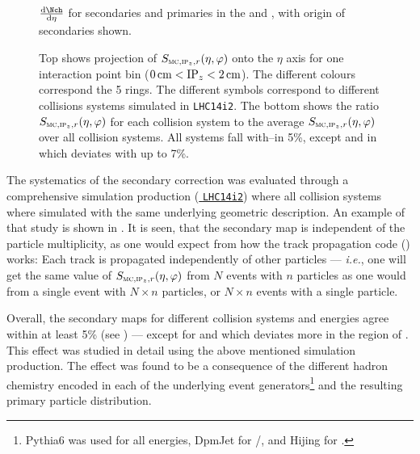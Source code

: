 \begin{figure}[htbp]
  \centering
  \caption{$\dndeta$ for secondaries and primaries in the \FMD{} and
    \SPD{}, with origin of secondaries shown.}
  \label{fig:secondaries:origin}
\end{figure} 

\begin{figure}[htbp]
  \centering
  \caption{Top shows projection of $\SecMap$ onto the $\eta$ axis for
    one interaction point bin ($\unit[0]{cm}<\IPz{}<\unit[2]{cm}$).
    The different colours correspond the 5 \FMD{} rings.  The
    different symbols correspond to different collisions systems
    simulated in \texttt{LHC14i2}.  The bottom shows the ratio
    $\SecMap$ for each collision system to the average $\SecMap$ over
    all collision systems. All systems fall with--in 5\%, except
    \PbpCol{} and \PbPbCol{} in  which deviates with up to
    7\%. }
  \label{fig:secmap:all}
\end{figure} 


 
The systematics of the secondary correction was evaluated through a
comprehensive simulation production
(\href{https://alimonitor.cern.ch/job_details.jsp?jt_field1=LHC14i2}{%
  \texttt{LHC14i2}}) where all collision systems where simulated with
the same underlying geometric description. An example of that study is
shown in .  It is seen, that the secondary map
is independent of the particle multiplicity, as one would expect from
how the track propagation code () works: Each track is
propagated independently of other particles --- \textit{i.e.}, one will
get the same value of $\SecMap$ from $N$ events with $n$ particles as
one would from a single event with $N\times n$ particles, or
$N\times n$ events with a single particle.

Overall, the secondary maps for different collision systems and
energies agree within at least 5\% (see ) ---
except for \PbPbCol{} and \PbpCol{} which deviates more in the region
of .  This effect was studied in detail using the above
mentioned simulation production.  The effect was found to be a
consequence of the different hadron chemistry encoded in each of the
underlying event generators\footnote{Pythia6 was used for all \ppCol{}
  energies, DpmJet for \pPbCol{}/\PbpCol{}, and Hijing for
  \PbPbCol{}.} and the resulting primary particle distribution.


